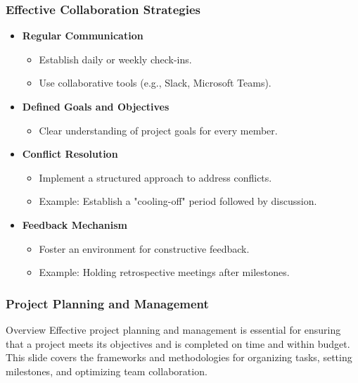 \documentclass[aspectratio=169]{beamer}
\begin{document}
\begin{frame}[fragile]
    \frametitle{Effective Collaboration Strategies}
    \begin{itemize}
        \item \textbf{Regular Communication}
            \begin{itemize}
                \item Establish daily or weekly check-ins.
                \item Use collaborative tools (e.g., Slack, Microsoft Teams).
            \end{itemize}
        \item \textbf{Defined Goals and Objectives}
            \begin{itemize}
                \item Clear understanding of project goals for every member.
            \end{itemize}
        \item \textbf{Conflict Resolution}
            \begin{itemize}
                \item Implement a structured approach to address conflicts.
                \item Example: Establish a "cooling-off" period followed by discussion.
            \end{itemize}
        \item \textbf{Feedback Mechanism}
            \begin{itemize}
                \item Foster an environment for constructive feedback.
                \item Example: Holding retrospective meetings after milestones.
            \end{itemize}
    \end{itemize}
\end{frame}

\begin{frame}[fragile]
  \frametitle{Project Planning and Management}
  \begin{block}{Overview}
    Effective project planning and management is essential for ensuring that a project meets its objectives and is completed on time and within budget. 
    This slide covers the frameworks and methodologies for organizing tasks, setting milestones, and optimizing team collaboration.
  \end{block}
\end{frame}
\end{document}
